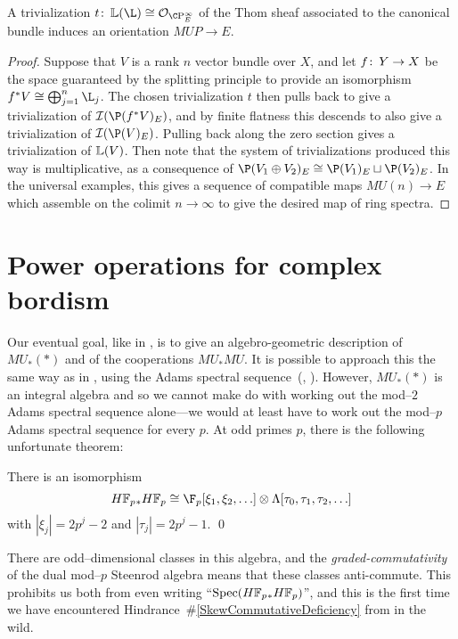 \begin{theorem}\label{ComplexOrientationsInTermsOfTrivs}
A trivialization \(t\co \ThomSheaf{\L} \cong \sheaf O_{\CP^\infty_E}\) of the Thom sheaf associated to the canonical bundle induces an orientation \(MUP \to E\).
\end{theorem}
\begin{proof}
Suppose that \(V\) is a rank \(n\) vector bundle over \(X\), and let \(f\colon\thinspace Y \to X\) be the space guaranteed by the splitting principle to provide an isomorphism \(f^* V \cong \bigoplus_{j=1}^n \L_j\).  The chosen trivialization \(t\) then pulls back to give a trivialization of \(\sheaf I(\P(f^* V)_E)\), and by finite flatness this descends to also give a trivialization of \(\sheaf I(\P(V)_E)\).  Pulling back along the zero section gives a trivialization of \(\mathbb{L}(V)\).  Then note that the system of trivializations produced this way is multiplicative, as a consequence of \(\P(V_1 \oplus V_2)_E \cong \P(V_1)_E \sqcup \P(V_2)_E\).  In the universal examples, this gives a sequence of compatible maps \(MU(n) \to E\) which assemble on the colimit \(n \to \infty\) to give the desired map of ring spectra.
\end{proof}










\section{Power operations for complex bordism}\label{QuillenPowerOpnsSection}

Our eventual goal, like in , is to give an algebro-geometric description of \(MU_*(*)\) and of the cooperations \(MU_* MU\).  It is possible to approach this the same way as in , using the Adams spectral sequence~(\cite[Theorem 2]{QuillenAdamsSS}, \cite[Lecture 9]{LurieChromaticCourseNotes}).  However, \(MU_*(*)\) is an integral algebra and so we cannot make do with working out the mod--\(2\) Adams spectral sequence alone---we would at least have to work out the mod--\(p\) Adams spectral sequence for every \(p\).  At odd primes \(p\), there is the following unfortunate theorem:
\begin{theorem}
There is an isomorphism
\[\HFp_* \HFp \cong \F_p[\xi_1, \xi_2, \ldots] \otimes \Lambda[\tau_0, \tau_1, \tau_2, \ldots]\]
with \(|\xi_j| = 2p^j-2\) and \(|\tau_j| = 2p^j - 1\). \qed
\end{theorem}
\noindent There are odd--dimensional classes in this algebra, and the \emph{graded-commutativity} of the dual mod--\(p\) Steenrod algebra means that these classes anti-commute.  This prohibits us both from even writing ``\(\Spec(\HFp_* \HFp)\)'', and this is the first time we have encountered Hindrance~\#\ref{SkewCommutativeDeficiency} from  in the wild.

